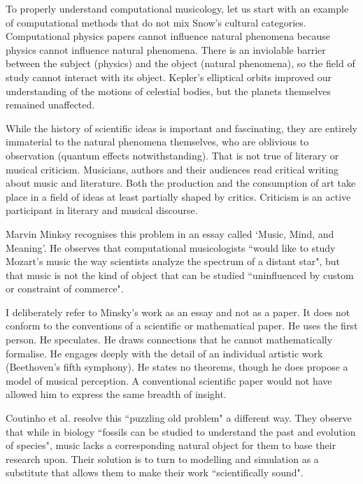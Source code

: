 \documentclass[numbers]{sigplanconf}
\begin{document}
To properly understand computational musicology, let us start with an example of computational methods that do not mix Snow's
cultural categories. Computational physics papers cannot
influence natural phenomena because physics cannot influence natural phenomena.
There is an inviolable barrier between the subject (physics) and
the object (natural phenomena), so the field of study cannot interact with its object.
Kepler's elliptical orbits improved our understanding of the motions of celestial bodies, but the planets themselves
remained unaffected.

While the history of scientific ideas is important and fascinating, they are entirely immaterial to the natural phenomena
themselves, who are oblivious to observation (quantum effects notwithstanding). That is not true of literary or musical criticism.
Musicians, authors and their audiences read critical writing about music and literature. Both the production and the consumption
of art take place in a field of ideas at least partially shaped by critics. Criticism is an active participant in literary and
musical discourse.

Marvin Minksy recognises this problem in an essay called `Music, Mind, and Meaning'. He observes that computational
musicologists ``would like to study Mozart's music the way scientists analyze the spectrum of a distant star", but that music
is not the kind of object that can be studied ``uninfluenced by custom or constraint of commerce"\cite{Music Mind and Meaning}.

I deliberately refer to Minsky's work as an essay and not as a paper. It does not conform to the conventions of a scientific
or mathematical paper. He uses the first person. He speculates. He draws connections that he cannot mathematically formalise.
He engages deeply with the detail of an individual artistic work (Beethoven's fifth symphony). He states no theorems, though he
does propose a model of musical perception. A conventional scientific paper would not have allowed him to express the same breadth
of insight.

Coutinho et al. resolve this ``puzzling old problem" a different way. They observe that while in biology ``fossils can be studied
to understand the
past and evolution of species", music lacks a corresponding natural object for them to base their research
upon\cite{Computational Musicology}. Their solution is to turn to modelling and simulation as a substitute that allows them
to make their work ``scientifically sound".
\end{document}
